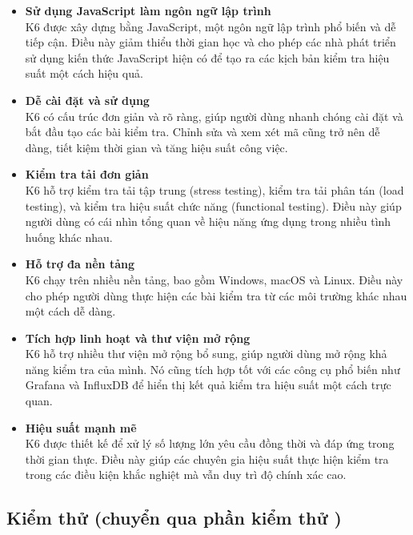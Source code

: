 \begin{itemize}
    \item \textbf{Sử dụng JavaScript làm ngôn ngữ lập trình}\\
    K6 được xây dựng bằng JavaScript, một ngôn ngữ lập trình phổ biến và dễ tiếp cận. Điều này giảm thiểu thời gian học và cho phép các nhà phát triển sử dụng kiến thức JavaScript hiện có để tạo ra các kịch bản kiểm tra hiệu suất một cách hiệu quả.
    \item \textbf{Dễ cài đặt và sử dụng}\\
    K6 có cấu trúc đơn giản và rõ ràng, giúp người dùng nhanh chóng cài đặt và bắt đầu tạo các bài kiểm tra. Chỉnh sửa và xem xét mã cũng trở nên dễ dàng, tiết kiệm thời gian và tăng hiệu suất công việc.
     \item \textbf{Kiểm tra tải đơn giản}\\
     K6 hỗ trợ kiểm tra tải tập trung (stress testing), kiểm tra tải phân tán (load testing), và kiểm tra hiệu suất chức năng (functional testing). Điều này giúp người dùng có cái nhìn tổng quan về hiệu năng ứng dụng trong nhiều tình huống khác nhau.
     \item \textbf{Hỗ trợ đa nền tảng}\\
     K6 chạy trên nhiều nền tảng, bao gồm Windows, macOS và Linux. Điều này cho phép người dùng thực hiện các bài kiểm tra từ các môi trường khác nhau một cách dễ dàng.
     \item \textbf{Tích hợp linh hoạt và thư viện mở rộng}\\
     K6 hỗ trợ nhiều thư viện mở rộng bổ sung, giúp người dùng mở rộng khả năng kiểm tra của mình. Nó cũng tích hợp tốt với các công cụ phổ biến như Grafana và InfluxDB để hiển thị kết quả kiểm tra hiệu suất một cách trực quan.
     \item \textbf{Hiệu suất mạnh mẽ}\\
     K6 được thiết kế để xử lý số lượng lớn yêu cầu đồng thời và đáp ứng trong thời gian thực. Điều này giúp các chuyên gia hiệu suất thực hiện kiểm tra trong các điều kiện khắc nghiệt mà vẫn duy trì độ chính xác cao.
\end{itemize}

\subsection{Kiểm thử (chuyển qua phần kiểm thử )}

